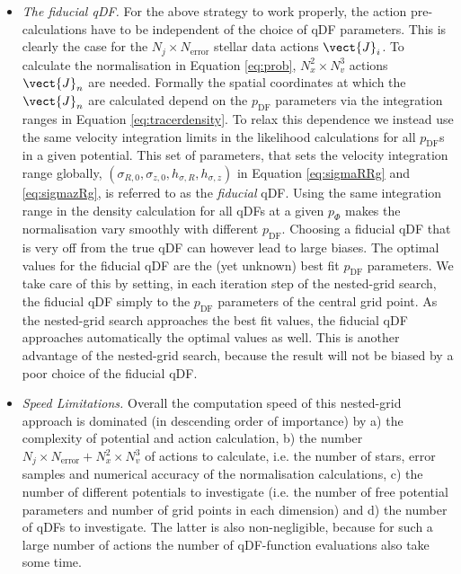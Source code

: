 \begin{itemize}
\item \emph{The fiducial qDF.} For the above strategy to work properly, the action pre-calculations have to be independent of the choice of qDF parameters. This is clearly the case for the $N_j \times N_\text{error}$ stellar data actions $\vect{J}_i$. To calculate the normalisation in Equation \ref{eq:prob}, $N_x^2 \times N_v^3$ actions $\vect{J}_n$ are needed. Formally the spatial coordinates at which the $\vect{J}_n$ are calculated depend on the $p_\text{DF}$ parameters via the integration ranges in Equation \ref{eq:tracerdensity}. To relax this dependence we instead use the same velocity integration limits in the likelihood calculations for all $p_\text{DF}$s in a given potential. This set of parameters, that sets the velocity integration range globally, $(\sigma_{R,0},\sigma_{z,0},h_{\sigma,R},h_{\sigma,z})$ in Equation \ref{eq:sigmaRRg} and \ref{eq:sigmazRg}, is referred to as the \emph{fiducial} qDF. Using the same integration range in the density calculation for all qDFs at a given $p_\Phi$ makes the normalisation vary smoothly with different $p_\text{DF}$. Choosing a fiducial qDF that is very off from the true qDF can however lead to large biases. The optimal values for the fiducial qDF are the (yet unknown) best fit $p_\text{DF}$ parameters. We take care of this by setting, in each iteration step of the nested-grid search, the fiducial qDF simply to the $p_\text{DF}$ parameters of the central grid point.  As the nested-grid search approaches the best fit values, the fiducial qDF approaches automatically the optimal values as well. This is another advantage of the nested-grid search, because the result will not be biased by a poor choice of the fiducial qDF.

\item \emph{Speed Limitations.} Overall the computation speed of this nested-grid approach is dominated (in descending order of importance) by a) the complexity of potential and action calculation, b) the number $N_j \times N_\text{error} + N_x^2 \times N_v^3$ of actions to calculate, i.e. the number of stars, error samples and numerical accuracy of the normalisation calculations, c) the number of different potentials to investigate (i.e. the number of free potential parameters and number of grid points in each dimension) and d) the number of qDFs to investigate. The latter is also non-negligible, because for such a large number of actions the number of  qDF-function evaluations also take some time.
\end{itemize}

